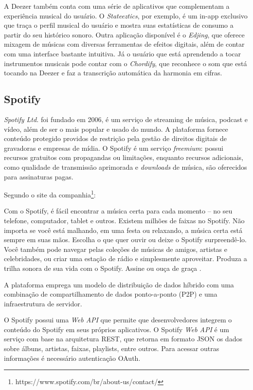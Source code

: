 A Deezer também conta com uma série de aplicativos que complementam a experiência musical do usuário. O \textit{Stateeztics}, por exemplo, é um in-app exclusivo que traça o perfil musical do usuário e mostra suas estatísticas de consumo a partir do seu histórico sonoro. Outra aplicação disponível é o \textit{Edjing}, que oferece mixagem de músicas com diversas ferramentas de efeitos digitais, além de contar com uma interface bastante intuitiva. Já o usuário que está aprendendo a tocar instrumentos musicais pode contar com o \textit{Chordify}, que reconhece o som que está tocando na Deezer e faz a transcrição automática da harmonia em cifras.

\subsection{Spotify}
\textit{Spotify Ltd.} foi fundado em 2006, é um serviço de streaming de música, podcast e vídeo, além de ser o mais popular e usado do mundo. A plataforma fornece conteúdo protegido providos de restrição pela gestão de direitos digitais de gravadoras e empresas de mídia. O Spotify é um serviço \textit{freemium}: possui recursos gratuitos com propagandas ou limitações, enquanto recursos adicionais, como qualidade de transmissão aprimorada e \textit{downloads} de música, são oferecidos para assinaturas pagas.

Segundo o site da companhia\footnote{https://www.spotify.com/br/about-us/contact/}:

\begin{citacao}
Com o Spotify, é fácil encontrar a música certa para cada momento – no seu telefone, computador, tablet e outros. Existem milhões de faixas no Spotify. Não importa se você está malhando, em uma festa ou relaxando, a música certa está sempre em suas mãos. Escolha o que quer ouvir ou deixe o Spotify surpreendê-lo. Você também pode navegar pelas coleções de músicas de amigos, artistas e celebridades, ou criar uma estação de rádio e simplesmente aproveitar. Produza a trilha sonora de sua vida com o Spotify. Assine ou ouça de graça \cite{spotify2006}.
\end{citacao}

A plataforma emprega um modelo de distribuição de dados híbrido com uma combinação de compartilhamento de dados ponto-a-ponto (P2P) e uma infraestrutura de servidor. 

O Spotify possui uma \textit{Web API} que permite que desenvolvedores integrem o conteúdo do Spotify em seus próprios aplicativos. O Spotify \textit{Web API} é um serviço com base na arquitetura REST, que retorna em formato JSON os dados sobre álbuns, artistas, faixas, playlists, entre outros. Para acessar outras informações é necessário autenticação OAuth.

